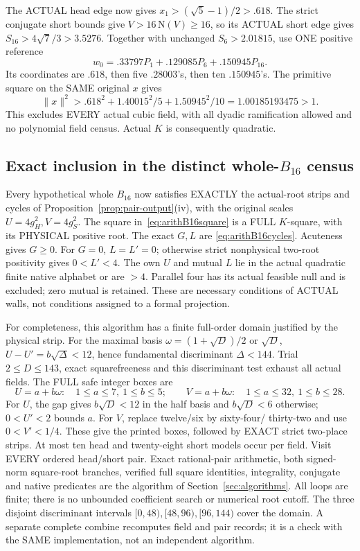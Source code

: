 The ACTUAL head edge now gives
\(x_1>(\sqrt5-1)/2>.618\).
The strict conjugate short bounds give
\(V>16\,\mathrm N(V)\ge16\), so its ACTUAL
short edge gives \(S_{16}>4\sqrt7/3>3.5276\).
Together with unchanged \(S_6>2.01815\), use
ONE positive reference
\[
 w_0=.33797P_1+.129085P_6+.150945P_{16}.
\]
Its coordinates are \(.618\), then five
\(.28003\)'s, then ten \(.150945\)'s.
The primitive square on the SAME original \(x\)
gives
\[
 \|x\|^2>
 .618^2+1.40015^2/5+1.50945^2/10
             =1.00185193475>1 .
\]
This excludes EVERY actual cubic field, with
all dyadic ramification allowed and no polynomial
field census.
Actual \(K\) is consequently quadratic.

\subsection{Exact inclusion in the distinct whole-\(B_{16}\) census}
\label{app:arithB16domain}

Every hypothetical whole \(B_{16}\) now satisfies
EXACTLY the actual-root strips and cycles of
Proposition~\ref{prop:pair-output}(iv), with the
original scales \(U=4g_H^2,V=4g_S^2\).
The square in~\eqref{eq:arithB16square} is a FULL
\(K\)-square, with its PHYSICAL positive root.
The exact \(G,L\) are
\eqref{eq:arithB16cycles}.
Acuteness gives \(G\ge0\).
For \(G=0\), \(L=L'=0\); otherwise strict
nonphysical two-root positivity gives \(0<L'<4\).
The own \(U\) and mutual \(L\) lie in the actual
quadratic finite native alphabet or are \(>4\).
Parallel four has its actual feasible null and
is excluded; zero mutual is retained.
These are necessary conditions of ACTUAL walls,
not conditions assigned to a formal projection.

For completeness, this algorithm has a finite
full-order domain justified by the physical strip.
For the maximal basis
\(\omega=(1+\sqrt D)/2\) or \(\sqrt D\),
\(U-U'=b\sqrt\Delta<12\), hence
fundamental discriminant \(\Delta<144\).
Trial \(2\le D\le143\), exact squarefreeness and
this discriminant test exhaust all actual fields.
The FULL safe integer boxes are
\[
 U=a+b\omega:\quad1\le a\le7,\ 1\le b\le5;\qquad
 V=a+b\omega:\quad1\le a\le32,\ 1\le b\le28 .
\]
For \(U\), the gap gives \(b\sqrt D<12\)
in the half basis and \(b\sqrt D<6\) otherwise;
\(0<U'<2\) bounds \(a\).
For \(V\), replace twelve/six by sixty-four/
thirty-two and use \(0<V'<1/4\).
These give the printed boxes, followed by EXACT
strict two-place strips.
At most ten head and twenty-eight short models
occur per field.
Visit EVERY ordered head/short pair.
Exact rational-pair arithmetic, both signed-norm
square-root branches, verified full square identities,
integrality, conjugate and native predicates are
the algorithm of Section~\ref{sec:algorithms}.
All loops are finite; there is no unbounded
coefficient search or numerical root cutoff.
The three disjoint discriminant intervals
\([0,48),[48,96),[96,144)\) cover the domain.
A separate complete combine recomputes field and
pair records; it is a check with the SAME
implementation, not an independent algorithm.


